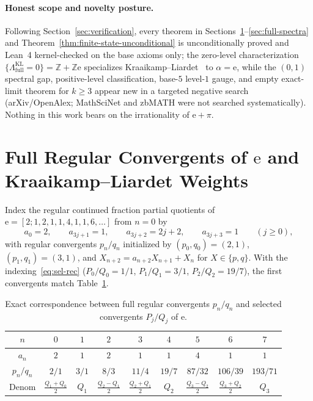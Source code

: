 \documentclass[11pt]{article}
\theoremstyle{definition}
\theoremstyle{remark}
\newcommand{\Z}{\mathbb{Z}}
\newcommand{\ee}{\mathrm{e}}
\newcommand{\Lam}{\Lambda}
\begin{document}
\paragraph{Honest scope and novelty posture.}
Following Section~\ref{sec:verification}, every theorem in Sections~\ref{sec:full-conv}--\ref{sec:full-spectra}
and Theorem~\ref{thm:finite-state-unconditional} is unconditionally proved and
Lean~4 kernel-checked on the base axioms only; the zero-level characterization
$\{\Lam_{\mathrm{full}}^{\mathrm{KL}}=0\}=\Z+\Z\ee$ specializes Kraaikamp--Liardet~\cite{KL}
to $\alpha=\ee$, while the $(0,1)$ spectral gap, positive-level classification,
base-$5$ level-$1$ gauge, and empty exact-limit theorem for $k\ge3$ appear new
in a targeted negative search (arXiv/OpenAlex; MathSciNet and zbMATH were not
searched systematically). Nothing in this work bears on the irrationality of $\ee+\pi$.

\section{Full Regular Convergents of $\ee$ and Kraaikamp--Liardet Weights}\label{sec:full-conv}

Index the regular continued fraction partial quotients of
$\ee=[2;1,2,1,1,4,1,1,6,\dots]$ from $n=0$ by
\[
a_0=2,\qquad a_{3j+1}=1,\qquad a_{3j+2}=2j+2,\qquad a_{3j+3}=1\qquad(j\ge0),
\]
with regular convergents $p_n/q_n$ initialized by $(p_0,q_0)=(2,1)$,
$(p_1,q_1)=(3,1)$, and $X_{n+2}=a_{n+2}X_{n+1}+X_n$ for $X\in\{p,q\}$.
With the indexing~\eqref{eq:sel-rec} ($P_0/Q_0=1/1$, $P_1/Q_1=3/1$,
$P_2/Q_2=19/7$), the first convergents match Table~\ref{tab:full-sel}.

\begin{table}[ht]
\centering\footnotesize
\setlength{\tabcolsep}{3.2pt}
\begin{tabular}{c|cccccccc}
\toprule
$n$ & $0$ & $1$ & $2$ & $3$ & $4$ & $5$ & $6$ & $7$\\
\midrule
$a_n$ & $2$ & $1$ & $2$ & $1$ & $1$ & $4$ & $1$ & $1$\\
$p_n/q_n$ & $2/1$ & $3/1$ & $8/3$ & $11/4$ & $19/7$ & $87/32$ & $106/39$ & $193/71$\\
Denom & $\frac{Q_1+Q_0}{2}$ & $Q_1$ & $\frac{Q_2-Q_1}{2}$ & $\frac{Q_2+Q_1}{2}$ & $Q_2$ & $\frac{Q_3-Q_2}{2}$ & $\frac{Q_3+Q_2}{2}$ & $Q_3$\\
\bottomrule
\end{tabular}
\caption{Exact correspondence between full regular convergents $p_n/q_n$ and selected convergents $P_j/Q_j$ of $\ee$.}\label{tab:full-sel}
\end{table}
\end{document}
